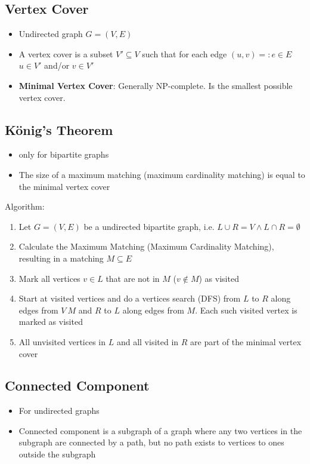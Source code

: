 \documentclass[a4paper,titlepage]{article}
\begin{document}
\subsection{Vertex Cover}
\begin{itemize}
\item Undirected graph $G = (V, E)$
\item A vertex cover is a subset $V' \subseteq V$ such that for each edge $(u, v) =: e \in E$ $u \in V'$ and/or $v \in V'$
\item \textbf{Minimal Vertex Cover}: Generally NP-complete. Is the smallest possible vertex cover.
\end{itemize}

\subsection{König's Theorem}
\begin{itemize}
\item only for bipartite graphs
\item The size of a maximum matching (maximum cardinality matching) is equal to the minimal vertex cover
\end{itemize}

Algorithm:
\begin{enumerate}
\item Let $G = (V, E)$ be a undirected bipartite graph, i.e. $L \cup R = V \land L \cap R = \emptyset$
\item Calculate the Maximum Matching (Maximum Cardinality Matching), resulting in a matching $M \subseteq E$
\item Mark all vertices $v \in L$ that are not in $M$ ($v \notin M$) as visited
\item Start at visited vertices and do a vertices search (DFS) from $L$ to $R$ along edges from $V \ M$ and $R$ to $L$ along edges from $M$. Each such visited vertex is marked as visited
\item All unvisited vertices in $L$ and all visited in $R$ are part of the minimal vertex cover
\end{enumerate}

\subsection{Connected Component}
\begin{itemize}
\item For undirected graphs
\item Connected component is a subgraph of a graph where any two vertices in the subgraph are connected by a path, but no path exists to vertices to ones outside the subgraph
\end{itemize}
\end{document}
